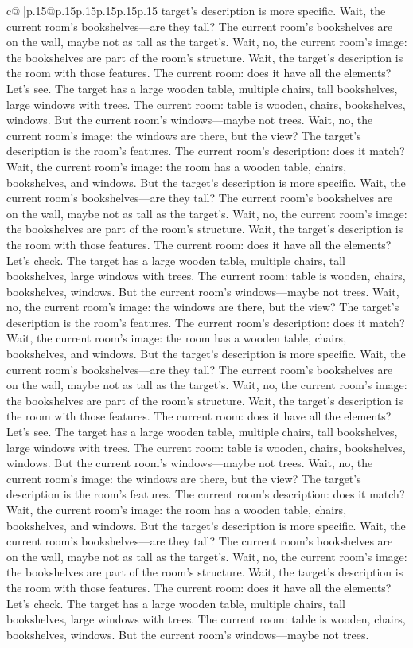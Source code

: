 \documentclass{article}
\begin{document}
{\begin{supertabular}{c@{$\;$}|p{.15\linewidth}@{}p{.15\linewidth}p{.15\linewidth}p{.15\linewidth}p{.15\linewidth}p{.15\linewidth}}
{{{target's description is more specific. Wait, the current room's bookshelves—are they tall? The current room's bookshelves are on the wall, maybe not as tall as the target's. Wait, no, the current room's image: the bookshelves are part of the room's structure. Wait, the target's description is the room with those features. The current room: does it have all the elements? Let's see. The target has a large wooden table, multiple chairs, tall bookshelves, large windows with trees. The current room: table is wooden, chairs, bookshelves, windows. But the current room's windows—maybe not trees. Wait, no, the current room's image: the windows are there, but the view? The target's description is the room's features. The current room's description: does it match? Wait, the current room's image: the room has a wooden table, chairs, bookshelves, and windows. But the target's description is more specific. Wait, the current room's bookshelves—are they tall? The current room's bookshelves are on the wall, maybe not as tall as the target's. Wait, no, the current room's image: the bookshelves are part of the room's structure. Wait, the target's description is the room with those features. The current room: does it have all the elements? Let's check. The target has a large wooden table, multiple chairs, tall bookshelves, large windows with trees. The current room: table is wooden, chairs, bookshelves, windows. But the current room's windows—maybe not trees. Wait, no, the current room's image: the windows are there, but the view? The target's description is the room's features. The current room's description: does it match? Wait, the current room's image: the room has a wooden table, chairs, bookshelves, and windows. But the target's description is more specific. Wait, the current room's bookshelves—are they tall? The current room's bookshelves are on the wall, maybe not as tall as the target's. Wait, no, the current room's image: the bookshelves are part of the room's structure. Wait, the target's description is the room with those features. The current room: does it have all the elements? Let's see. The target has a large wooden table, multiple chairs, tall bookshelves, large windows with trees. The current room: table is wooden, chairs, bookshelves, windows. But the current room's windows—maybe not trees. Wait, no, the current room's image: the windows are there, but the view? The target's description is the room's features. The current room's description: does it match? Wait, the current room's image: the room has a wooden table, chairs, bookshelves, and windows. But the target's description is more specific. Wait, the current room's bookshelves—are they tall? The current room's bookshelves are on the wall, maybe not as tall as the target's. Wait, no, the current room's image: the bookshelves are part of the room's structure. Wait, the target's description is the room with those features. The current room: does it have all the elements? Let's check. The target has a large wooden table, multiple chairs, tall bookshelves, large windows with trees. The current room: table is wooden, chairs, bookshelves, windows. But the current room's windows—maybe not trees. }}}
\end{supertabular}}
\end{document}
